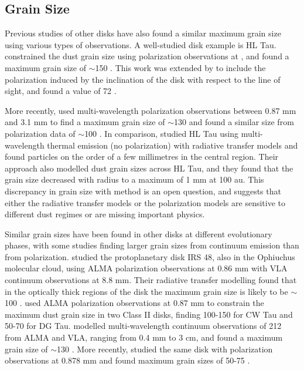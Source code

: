 \subsection{Grain Size}
Previous studies of other disks have also found a similar maximum grain size using various types of observations. A well-studied disk example is HL Tau. \cite{Kataoka2016} constrained the dust grain size using polarization observations at \bsixNS, and found a maximum grain size of $\sim$150 \micronNS. 
This work was extended by \cite{Yang2016} to include the polarization induced by the inclination of the disk with respect to the line of sight, and found a value of 72 \micronNS. 



More recently, \cite{Mori} used multi-wavelength polarization observations between 0.87 mm and 3.1 mm to find a maximum grain size of $\sim$130 \micron and \cite{Ueda} found a similar size from polarization data of $\sim$100 \micronNS.  In comparison, \cite{Carrasco} studied HL Tau using multi-wavelength thermal emission (no polarization) with radiative transfer models and found particles on the order of a few millimetres in the central region.  Their approach also modelled dust grain sizes across HL Tau, and they found that the grain size decreased with radius to a maximum of 1 mm at 100 au.  This discrepancy in grain size with method is an open question, and suggests that either the radiative transfer models or the polarization models are sensitive to different dust regimes or are missing important physics.







Similar grain sizes have been found in other disks at different evolutionary phases, with some studies finding larger grain sizes from continuum emission than from polarization.  \cite{Ohashi} studied the protoplanetary disk IRS 48, also in the Ophiuchus molecular cloud, using ALMA polarization observations at 0.86 mm with VLA continuum observations at 8.8 mm. Their radiative transfer modelling found that in the optically thick regions of the disk the maximum grain size is likely to be $\sim$100 \micronNS. \cite{Bacciotti_2018} used ALMA polarization observations at 0.87 mm to constrain the maximum dust grain size in two Class II disks, finding 100-150 \micron for CW Tau and 50-70 \micron for DG Tau. \cite{Hu} modelled multi-wavelength continuum observations of 212 from ALMA and VLA, ranging from 0.4 mm to 3 cm, and found a maximum grain size of $\sim$130 \micronNS. More recently, \cite{Lee_2021} studied the same disk with polarization observations at 0.878 mm and found maximum grain sizes of 50-75 \micronNS.


